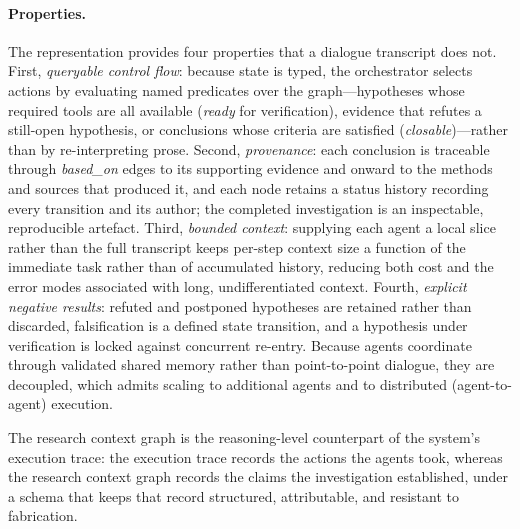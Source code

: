 \paragraph{Properties.}
The representation provides four properties that a dialogue transcript does not.
First, \emph{queryable control flow}: because state is typed, the orchestrator
selects actions by evaluating named predicates over the graph---hypotheses whose
required tools are all available (\emph{ready} for verification), evidence that
refutes a still-open hypothesis, or conclusions whose criteria are satisfied
(\emph{closable})---rather than by re-interpreting prose. Second,
\emph{provenance}: each conclusion is traceable through \emph{based\_on} edges to
its supporting evidence and onward to the methods and sources that produced it,
and each node retains a status history recording every transition and its author;
the completed investigation is an inspectable, reproducible artefact. Third,
\emph{bounded context}: supplying each agent a local slice rather than the full
transcript keeps per-step context size a function of the immediate task rather
than of accumulated history, reducing both cost and the error modes associated
with long, undifferentiated context. Fourth, \emph{explicit negative results}:
refuted and postponed hypotheses are retained rather than discarded, falsification
is a defined state transition, and a hypothesis under verification is locked
against concurrent re-entry. Because agents coordinate through validated shared
memory rather than point-to-point dialogue, they are decoupled, which admits
scaling to additional agents and to distributed (agent-to-agent) execution.

The research context graph is the reasoning-level counterpart of the system's
execution trace: the execution trace records the actions the agents took, whereas
the research context graph records the claims the investigation established, under
a schema that keeps that record structured, attributable, and resistant to
fabrication.
